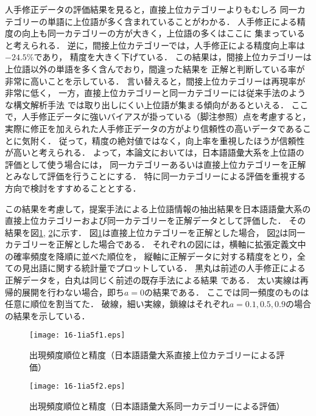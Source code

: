 \documentclass[japanese]{jnlp_1.4}
\begin{document}
人手修正データの評価結果を見ると，直接上位カテゴリーよりもむしろ
同一カテゴリーの単語に上位語が多く含まれていることがわかる．
人手修正による精度の向上も同一カテゴリーの方が大きく，上位語の多くはここに
集まっていると考えられる．
逆に，間接上位カテゴリーでは，人手修正による精度向上率は$-24.5\%$であり，
精度を大きく下げている．
この結果は，間接上位カテゴリーは
上位語以外の単語を多く含んでおり，間違った結果を
正解と判断している率が非常に高いことを示している．
{言い替えると，間接上位カテゴリーは再現率が非常に低く，
一方，直接上位カテゴリーと同一カテゴリーには従来手法のような構文解析手法
では取り出しにくい上位語が集まる傾向があるといえる．
ここで，人手修正データに強いバイアスが掛っている（脚注参照）点を考慮すると，
実際に修正を加えられた人手修正データの方がより信頼性の高いデータであることに気附く．
従って，精度の絶対値ではなく，向上率を重視したほうが信頼性が高いと考えられる．
よって，本論文においては，日本語語彙大系を上位語の評価として使う場合には，
同一カテゴリーあるいは直接上位カテゴリーを正解とみなして評価を行うことにする．
特に同一カテゴリーによる評価を重視する方向で検討をすすめることとする．
}


この結果を考慮して，提案手法による上位語情報の抽出結果を日本語語彙大系の
直接上位カテゴリーおよび同一カテゴリーを正解データとして評価した．
その結果を図\ref{fig:hyper-above}, \ref{fig:hyper-same}に示す．
図\ref{fig:hyper-above}は直接上位カテゴリーを正解とした場合，
図\ref{fig:hyper-same}は同一カテゴリーを正解とした場合である．
それぞれの図には，横軸に拡張定義文中の確率頻度を降順に並べた順位を，
縦軸に正解データに対する精度をとり，全ての見出語に関する統計量でプロットしている．
黒丸は前述の人手修正による正解データを，白丸は同じく前述の既存手法による結果
である．
太い実線は再帰的展開を行わない場合，即ち$a=0$の結果である．
ここでは同一頻度のものは任意に順位を割当てた．
破線，細い実線，鎖線はそれぞれ$a=0.1,0.5,0.9$の場合の結果を示している．

\begin{figure}[b]
\vspace{-1\baselineskip}
\begin{center}
\texttt{[image: 16-1ia5f1.eps]}
\end{center}
\caption{出現頻度順位と精度（日本語語彙大系直接上位カテゴリーによる評価）}
\label{fig:hyper-above}
\end{figure}

\begin{figure}[t]
\begin{center}
\texttt{[image: 16-1ia5f2.eps]}
\end{center}
\caption{出現頻度順位と精度（日本語語彙大系同一カテゴリーによる評価）}
\label{fig:hyper-same}
\end{figure}
\end{document}
